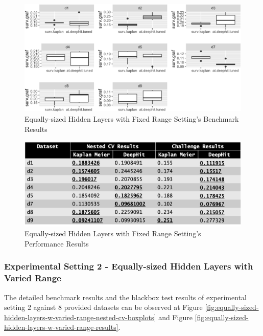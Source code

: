 \documentclass[
]{article}
\begin{document}
\begin{figure}

{\centering \includegraphics[width=0.8\linewidth]{equally-sized-hidden-layers-w-fixed-range-nested-cv-boxplots} 

}

\caption{Equally-sized Hidden Layers with Fixed Range Setting's Benchmark Results}\label{fig:equally-sized-hidden-layers-w-fixed-range-nested-cv-boxplots}
\end{figure}

\begin{figure}

{\centering \includegraphics[width=0.8\linewidth]{equally-sized-hidden-layers-w-fixed-range-results} 

}

\caption{Equally-sized Hidden Layers with Fixed Range Setting's Performance Results}\label{fig:equally-sized-hidden-layers-w-fixed-range-results}
\end{figure}

\hypertarget{ex2}{%
\subsubsection{Experimental Setting 2 - Equally-sized Hidden Layers with Varied Range}\label{ex2}}

The detailed benchmark results and the blackbox test results of experimental setting 2 against 8 provided datasets can be observed at Figure \ref{fig:equally-sized-hidden-layers-w-varied-range-nested-cv-boxplots} and Figure \ref{fig:equally-sized-hidden-layers-w-varied-range-results}.
\end{document}
